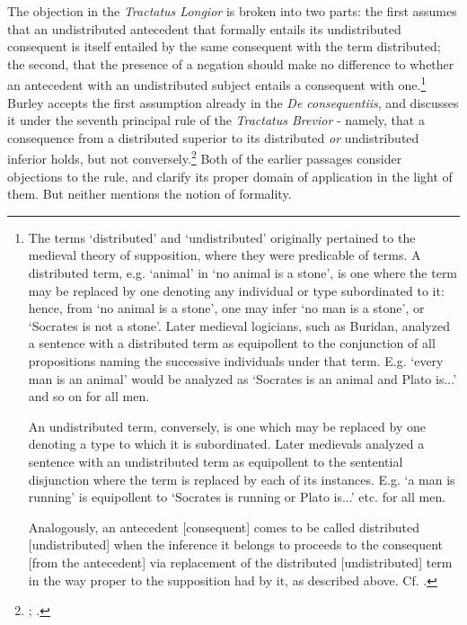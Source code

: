\documentclass[]{birkjour}
\begin{document}
The objection in the \textit{Tractatus Longior} is broken into two parts: the first assumes that an undistributed antecedent that formally entails its undistributed consequent is itself entailed by the same consequent with the term distributed; the second, that the presence of a negation should make no difference to whether an antecedent with an undistributed subject entails a consequent with one.\footnote{The terms `distributed' and `undistributed' originally pertained to the medieval theory of supposition, where they were predicable of terms. A distributed term, e.g. `animal' in `no animal is a stone', is one where the term may be replaced by one denoting any individual or type subordinated to it: hence, from `no animal is a stone', one may infer `no man is a stone', or `Socrates is not a stone'. Later medieval logicians, such as Buridan, analyzed a sentence with a distributed term as equipollent to the conjunction of all propositions naming the successive individuals under that term. E.g. `every man is an animal' would be analyzed as `Socrates is an animal and Plato is...' and so on for all men. 
	
	An undistributed term, conversely, is one which may be replaced by one denoting a type to which it is subordinated. Later medievals analyzed a sentence with an undistributed term as equipollent to the sentential disjunction where the term is replaced by each of its instances. E.g. `a man is running' is equipollent to `Socrates is running or Plato is...' etc. for all men.
	
	Analogously, an antecedent [consequent] comes to be called distributed [undistributed] when the inference it belongs to proceeds to the consequent [from the antecedent] via replacement of the distributed [undistributed] term in the way proper to the supposition had by it, as described above. Cf. \autocite[ch. 1]{Klima1988}.} Burley accepts the first assumption already in the \textit{De consequentiis}, and discusses it under the seventh principal rule of the \textit{Tractatus Brevior} - namely, that a consequence from a distributed superior to its distributed \textit{or} undistributed inferior holds, but not conversely.\footnote{\autocite[pp. 117-118, par. 26-31]{Green-Pedersen1980b}; \autocite[pp. 211.21-212.28]{BurleyDPAL}.} Both of the earlier passages consider objections to the rule, and clarify its proper domain of application in the light of them. But neither mentions the notion of formality.
\end{document}

